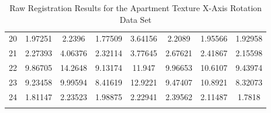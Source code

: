 \begin{center}
\begin{longtable}{cccccccc}
20 & 1.97251 & 2.2396 & 1.77509 & 3.64156 & 2.2089 & 1.95566 & 1.92958\\
21 & 2.27393 & 4.06376 & 2.32114 & 3.77645 & 2.67621 & 2.41867 & 2.15598\\
22 & 9.86705 & 14.2648 & 9.13174 & 11.947 & 9.96653 & 10.6107 & 9.43974\\
23 & 9.23458 & 9.99594 & 8.41619 & 12.9221 & 9.47407 & 10.8921 & 8.32073\\
24 & 1.81147 & 2.23523 & 1.98875 & 2.22941 & 2.39562 & 2.11487 & 1.7818\\
\caption{Raw Registration Results for the Apartment Texture X-Axis Rotation Data Set}
\label{tab:apartmenttexturex-axisrotationFULL}
\end{longtable}
\end{center} 



